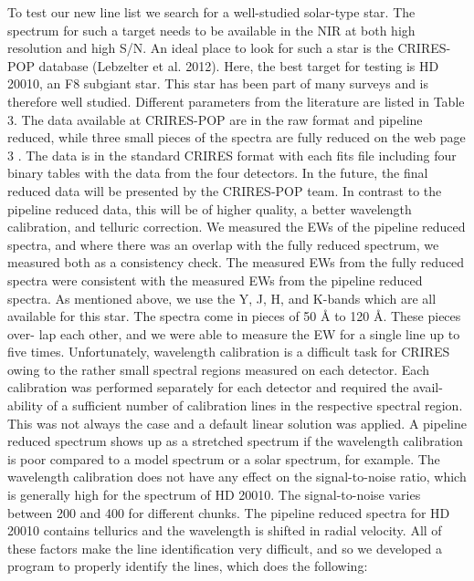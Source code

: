 To test our new line list we search for a well-studied solar-type star. The spectrum for such a
target needs to be available in the NIR at both high resolution and high S/N. An ideal place to look
for such a star is the CRIRES-POP database (Lebzelter et al. 2012). Here, the best target for
testing is HD 20010, an F8 subgiant star. This star has been part of many surveys and is therefore
well studied. Different parameters from the literature are listed in Table 3. The data available at
CRIRES-POP are in the raw format and pipeline reduced, while three small pieces of the spectra are
fully reduced on the web page 3 . The data is in the standard CRIRES format with each fits file
including four binary tables with the data from the four detectors. In the future, the final reduced
data will be presented by the CRIRES-POP team. In contrast to the pipeline reduced data, this will
be of higher quality, a better wavelength calibration, and telluric correction. We measured the EWs
of the pipeline reduced spectra, and where there was an overlap with the fully reduced spectrum, we
measured both as a consistency check. The measured EWs from the fully reduced spectra were
consistent with the measured EWs from the pipeline reduced spectra. As mentioned above, we use the
Y, J, H, and K-bands which are all available for this star. The spectra come in pieces of 50 Å to
120 Å. These pieces over- lap each other, and we were able to measure the EW for a single line up to
five times. Unfortunately, wavelength calibration is a difficult task for CRIRES owing to the rather
small spectral regions measured on each detector. Each calibration was performed separately for each
detector and required the avail- ability of a sufficient number of calibration lines in the
respective spectral region. This was not always the case and a default linear solution was applied.
A pipeline reduced spectrum shows up as a stretched spectrum if the wavelength calibration is poor
compared to a model spectrum or a solar spectrum, for example. The wavelength calibration does not
have any effect on the signal-to-noise ratio, which is generally high for the spectrum of HD 20010.
The signal-to-noise varies between 200 and 400 for different chunks. The pipeline reduced spectra
for HD 20010 contains tellurics and the wavelength is shifted in radial velocity. All of these
factors make the line identification very difficult, and so we developed a program to properly
identify the lines, which does the following:

